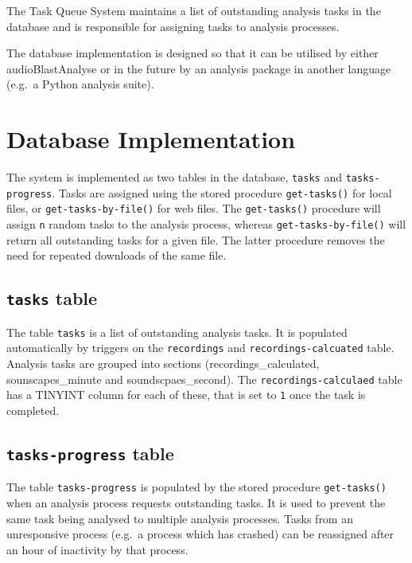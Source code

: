 \documentclass[
]{book}
\begin{document}
The Task Queue System maintains a list of outstanding analysis tasks in the database and is responsible for assigning tasks to analysis processes.

The database implementation is designed so that it can be utilised by either audioBlastAnalyse or in the future by an analysis package in another language (e.g.~a Python analysis suite).

\hypertarget{database-implementation}{%
\section{Database Implementation}\label{database-implementation}}

The system is implemented as two tables in the database, \texttt{tasks} and \texttt{tasks-progress}. Tasks are assigned using the stored procedure \texttt{get-tasks()} for local files, or \texttt{get-tasks-by-file()} for web files. The \texttt{get-tasks()} procedure will assign \texttt{n} random tasks to the analysis process, whereas \texttt{get-tasks-by-file()} will return all outstanding tasks for a given file. The latter procedure removes the need for repeated downloads of the same file.

\hypertarget{tasks-table}{%
\subsection{\texorpdfstring{\texttt{tasks} table}{tasks table}}\label{tasks-table}}

The table \texttt{tasks} is a list of outstanding analysis tasks. It is populated automatically by triggers on the \texttt{recordings} and \texttt{recordings-calcuated} table. Analysis tasks are grouped into sections (recordings\_calculated, sounscapes\_minute and soundscpaes\_second). The \texttt{recordings-calculaed} table has a TINYINT column for each of these, that is set to \texttt{1} once the task is completed.

\hypertarget{tasks-progress-table}{%
\subsection{\texorpdfstring{\texttt{tasks-progress} table}{tasks-progress table}}\label{tasks-progress-table}}

The table \texttt{tasks-progress} is populated by the stored procedure \texttt{get-tasks()} when an analysis process requests outstanding tasks. It is used to prevent the same task being analysed to multiple analysis processes. Tasks from an unresponsive process (e.g.~a process which has crashed) can be reassigned after an hour of inactivity by that process.
\end{document}
